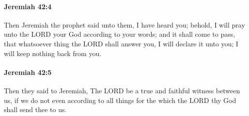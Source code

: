 		\paragraph{Jeremiah 42:4} %
			\label{JEREMIAH-42-4}

			Then Jeremiah the prophet said unto them, I have heard you; behold, I will pray unto the LORD your God according to your words; and it shall come to pass, that whatsoever thing the LORD shall answer you, I will declare it unto you; I will keep nothing back from you.


		\paragraph{Jeremiah 42:5} %
			\label{JEREMIAH-42-5}

			Then they said to Jeremiah, The LORD be a true and faithful witness between us, if we do not even according to all things for the which the LORD thy God shall send thee to us.

